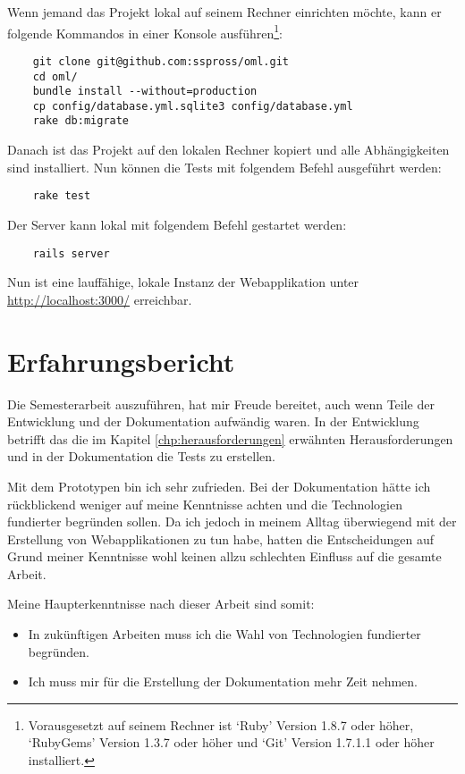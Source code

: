 Wenn jemand das Projekt lokal auf seinem Rechner einrichten möchte, kann er
folgende Kommandos in einer Konsole ausführen\footnote{Vorausgesetzt auf seinem
Rechner ist `Ruby' Version 1.8.7 oder höher, `RubyGems' Version 1.3.7 oder 
höher und `Git' Version 1.7.1.1 oder höher installiert.}:

\begin{verbatim}
    git clone git@github.com:sspross/oml.git
    cd oml/
    bundle install --without=production
    cp config/database.yml.sqlite3 config/database.yml
    rake db:migrate
\end{verbatim}

Danach ist das Projekt auf den lokalen Rechner kopiert und alle Abhängigkeiten
sind installiert. Nun können die Tests mit folgendem Befehl ausgeführt werden:

\begin{verbatim}
    rake test
\end{verbatim}

Der Server kann lokal mit folgendem Befehl gestartet werden:

\begin{verbatim}
    rails server
\end{verbatim}

Nun ist eine lauffähige, lokale Instanz der Webapplikation unter 
\url{http://localhost:3000/} erreichbar.  

\section{Erfahrungsbericht}
Die Semesterarbeit auszuführen, hat mir Freude bereitet, auch wenn
Teile der Entwicklung und der Dokumentation aufwändig waren. In der Entwicklung
betrifft das die im Kapitel \ref{chp:herausforderungen} erwähnten Herausforderungen 
und in der Dokumentation die Tests zu erstellen.

Mit dem Prototypen bin ich sehr zufrieden. Bei der Dokumentation hätte ich
rückblickend weniger auf meine Kenntnisse achten und die Technologien fundierter
begründen sollen. Da ich jedoch in meinem Alltag überwiegend mit der Erstellung von 
Webapplikationen zu tun habe, hatten die Entscheidungen auf Grund meiner Kenntnisse 
wohl keinen allzu schlechten Einfluss auf die gesamte Arbeit.

Meine Haupterkenntnisse nach dieser Arbeit sind somit:

\begin{itemize}
    \item In zukünftigen Arbeiten muss ich die Wahl von Technologien fundierter begründen.
    \item Ich muss mir für die Erstellung der Dokumentation mehr Zeit nehmen.
\end{itemize}

